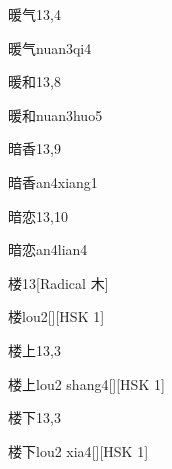 \begin{entry}{暖气}{13,4}
  \begin{phonetics}{暖气}{nuan3qi4}
  \end{phonetics}
\end{entry}

\begin{entry}{暖和}{13,8}
  \begin{phonetics}{暖和}{nuan3huo5}
  \end{phonetics}
\end{entry}

\begin{entry}{暗香}{13,9}
  \begin{phonetics}{暗香}{an4xiang1}
  \end{phonetics}
\end{entry}

\begin{entry}{暗恋}{13,10}
  \begin{phonetics}{暗恋}{an4lian4}
  \end{phonetics}
\end{entry}

\begin{entry}{楼}{13}[Radical 木]
  \begin{phonetics}{楼}{lou2}[][HSK 1]
  \end{phonetics}
\end{entry}

\begin{entry}{楼上}{13,3}
  \begin{phonetics}{楼上}{lou2 shang4}[][HSK 1]
  \end{phonetics}
\end{entry}

\begin{entry}{楼下}{13,3}
  \begin{phonetics}{楼下}{lou2 xia4}[][HSK 1]
  \end{phonetics}
\end{entry}

